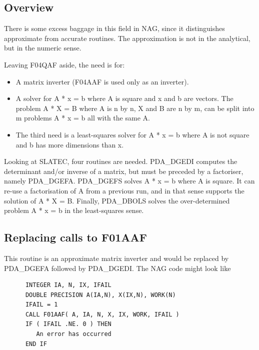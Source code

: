 \documentclass[11pt,twoside]{article}
\newcommand{\htmlref}[2]{#1}
\newcommand{\xlabel}[1]{}
\begin{document}

\subsection{\xlabel{overview}Overview}

   There is some excess baggage in this field in NAG, since it
   distinguishes approximate from accurate routines. The approximation
   is not in the analytical, but in the numeric sense.

   Leaving F04QAF aside, the need is for:

\begin{itemize}
\item A matrix inverter (F04AAF is used only as an inverter).
\item A solver for A * x = b where A is square and x and b are vectors.
   The problem A * X = B where A is n by n, X and B are n by m, can be
   split into m problems A * x = b all with the same A.
\item The third need is a least-squares solver for A * x = b where A is
   not square and b has more dimensions than x.
\end{itemize}

   Looking at SLATEC, four routines are needed. PDA\_DGEDI computes the
   determinant and/or inverse of a matrix, but must be preceded by a
   factoriser, namely PDA\_DGEFA. PDA\_DGEFS solves A * x = b where A is square.
   It can re-use a factorisation of A from a previous run, and in that
   sense supports the solution of A * X = B. Finally, PDA\_DBOLS solves the
   over-determined problem A * x = b in the least-squares sense. 


\subsection{\xlabel{replacing_calls_to_f01aaf}Replacing calls to F01AAF}

   This routine is an approximate matrix inverter and would be replaced
   by
\htmlref{PDA\_DGEFA}{PDA\_DGEFA}
   followed by
\htmlref{PDA\_DGEDI.}{PDA\_DGEDI}
   The NAG code might look like

\begin{verbatim}
      INTEGER IA, N, IX, IFAIL
      DOUBLE PRECISION A(IA,N), X(IX,N), WORK(N)
      IFAIL = 1
      CALL F01AAF( A, IA, N, X, IX, WORK, IFAIL )
      IF ( IFAIL .NE. 0 ) THEN
         An error has occurred
      END IF
\end{verbatim}
\end{document}
